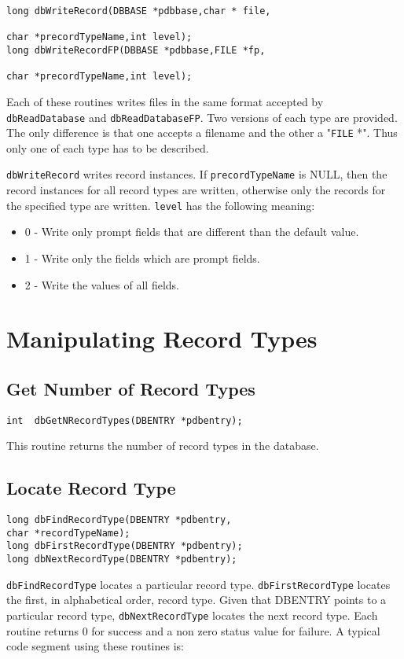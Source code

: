 \begin{verbatim}long dbWriteRecord(DBBASE *pdbbase,char * file,

char *precordTypeName,int level);
long dbWriteRecordFP(DBBASE *pdbbase,FILE *fp,

char *precordTypeName,int level);
\end{verbatim}
Each of these routines writes files in the same format accepted by \verb|dbReadDatabase| and \verb|dbReadDatabaseFP|. Two 
versions of each type are provided. The only difference is that one accepts a filename and the other a "\verb|FILE| *". Thus only 
one of each type has to be described.

\verb|dbWriteRecord| writes record instances. If \verb|precordTypeName| is NULL, then the record instances for all record 
types are written, otherwise only the records for the specified type are written. \verb|level| has the following meaning:

\begin{itemize}\item 0 - Write only prompt fields that are different than the default value.

\item 1 - Write only the fields which are prompt fields.

\item 2 - Write the values of all fields.

\end{itemize}\section{Manipulating Record Types}

\subsection{Get Number of Record Types}

\begin{verbatim}int  dbGetNRecordTypes(DBENTRY *pdbentry);
\end{verbatim}This routine returns the number of record types in the database.

\subsection{Locate Record Type}

\begin{verbatim}long dbFindRecordType(DBENTRY *pdbentry,
char *recordTypeName);
long dbFirstRecordType(DBENTRY *pdbentry);
long dbNextRecordType(DBENTRY *pdbentry);
\end{verbatim}
\verb|dbFindRecordType| locates a particular record type. \verb|dbFirstRecordType| locates the first, in alphabetical order, 
record type. Given that DBENTRY points to a particular record type, \verb|dbNextRecordType| locates the next record type. 
Each routine returns 0 for success and a non zero status value for failure. A typical code segment using these routines is:

